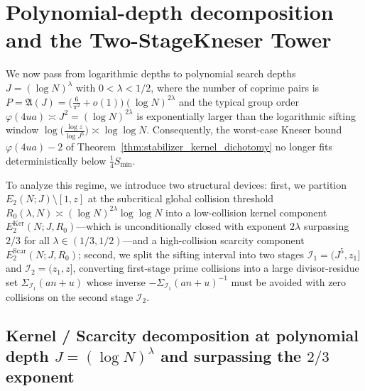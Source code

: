 \documentclass[11pt, a4paper]{article}
\theoremstyle{plain}
\theoremstyle{definition}
\begin{document}
\section[Polynomial-depth decomposition and the Two-Stage Kneser Tower]{Polynomial-depth decomposition and the Two-Stage\linebreak Kneser Tower}\label{sec:poly_depth_and_tower}

We now pass from logarithmic depths to polynomial search depths $J=(\log N)^{\lambda}$ with $0<\lambda<1/2$, where the number of coprime pairs is $P=\mathfrak{A}(J)=\big(\frac{6}{\pi^{2}}+o(1)\big)(\log N)^{2\lambda}$ and the typical group order $\varphi(4ua)\asymp J^{2}=(\log N)^{2\lambda}$ is exponentially larger than the logarithmic sifting window $\log\big(\frac{\log z}{\log J^{5}}\big)\asymp\log\log N$. Consequently, the worst-case Kneser bound $\varphi(4ua)-2$ of Theorem~\ref{thm:stabilizer_kernel_dichotomy} no longer fits deterministically below $\frac14 S_{\min}$.

To analyze this regime, we introduce two structural devices: first, we partition $E_2(N;J)\setminus[1,z]$ at the subcritical global collision threshold $R_0(\lambda,N)\asymp(\log N)^{2\lambda}\log\log N$ into a low-collision kernel component $E_2^{\mathrm{Ker}}(N;J,R_0)$—which is unconditionally closed with exponent $2\lambda$ surpassing $2/3$ for all $\lambda\in(1/3,1/2)$—and a high-collision scarcity component $E_2^{\mathrm{Scar}}(N;J,R_0)$; second, we split the sifting interval into two stages $\mathcal{I}_1=(J^5,z_1]$ and $\mathcal{I}_2=(z_1,z]$, converting first-stage prime collisions into a large divisor-residue set $\Sigma_{\mathcal{I}_1}(an+u)$ whose inverse $-\Sigma_{\mathcal{I}_1}(an+u)^{-1}$ must be avoided with zero collisions on the second stage $\mathcal{I}_2$.

\subsection{Kernel / Scarcity decomposition at polynomial depth $J=(\log N)^{\lambda}$ and surpassing the $2/3$ exponent}\label{subsec:poly_depth_decomp}
\end{document}

